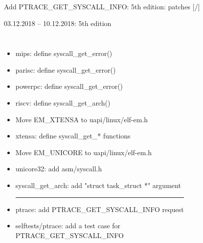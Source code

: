 \documentclass[unicode,aspectratio=169,xcolor={table,dvipsnames,usernames}]{beamer}
\begin{document}
\begin{frame}{Add PTRACE\_GET\_SYSCALL\_INFO: 5th edition: patches \hfill [\insertframenumber/\inserttotalframenumber]}
\begin{block}{03.12.2018 -- 10.12.2018: 5th edition}
\begin{itemize}
\begin{columns}
\begin{itemize}
				\item mips: define syscall\_get\_error()
				\item parisc: define syscall\_get\_error()
				\item powerpc: define syscall\_get\_error()
				\item riscv: define syscall\_get\_arch()
				\item Move EM\_XTENSA to uapi/linux/elf-em.h
				\item xtensa: define syscall\_get\_* functions
				\item Move EM\_UNICORE to uapi/linux/elf-em.h
				\item unicore32: add asm/syscall.h
				\item syscall\_get\_arch: add "struct task\_struct *" argument
				\smallskip \hrule
				\item ptrace: add PTRACE\_GET\_SYSCALL\_INFO request
				\item selftests/ptrace: add a test case for \\ PTRACE\_GET\_SYSCALL\_INFO
			\end{itemize}
	\end{columns}
\end{itemize}
\end{block}
\end{frame}
\end{document}
